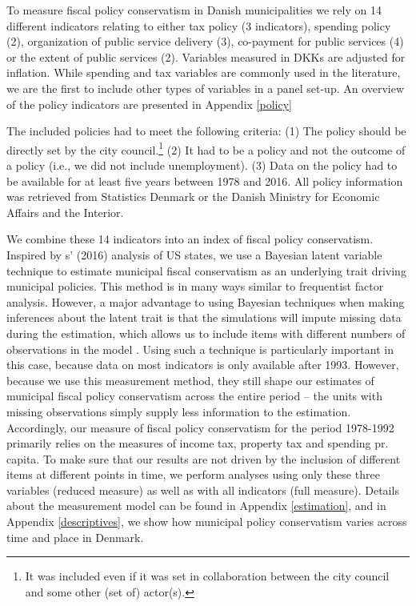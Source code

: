 \documentclass[a4paper,12pt]{article}
\begin{document}
To measure fiscal policy conservatism in Danish municipalities we rely on 14 different indicators relating to either tax policy (3 indicators), spending policy (2), organization of public service delivery (3), co-payment for public services (4) or the extent of public services (2). Variables measured in DKKs are adjusted for inflation. While  spending and tax variables are commonly used in the literature, we are the first to include other types of variables in a panel set-up. An overview of the policy indicators are presented in Appendix \ref{policy}


The included policies had to meet the following criteria: (1) The policy should be directly set by the city council.\footnote{It was included even if it was set in collaboration between the city council and some other (set of) actor(s).} (2) It had to be a policy and not the outcome of a policy (i.e., we did not include unemployment). (3) Data on the policy had to be available for at least five years between 1978 and 2016. All policy information was retrieved from Statistics Denmark or the Danish Ministry for Economic Affairs and the Interior.


We combine these 14 indicators into an index of fiscal policy conservatism. Inspired by \citeauthor{caughey2016dynamics}s' (2016) analysis of US states, we use a Bayesian latent variable technique to estimate municipal fiscal conservatism as an underlying trait driving municipal policies.  This method is in many ways similar to frequentist factor analysis. However, a major advantage to using Bayesian techniques when making inferences about the latent trait is that the simulations will impute missing data during the estimation, which allows us to include items with different numbers of observations in the model . Using such a technique is particularly important in this case, because data on most indicators is only available after 1993. However, because we use this measurement method, they still shape our estimates of municipal fiscal policy conservatism across the entire period -- the units with missing observations simply supply less information to the estimation. Accordingly, our measure of fiscal policy conservatism for the period 1978-1992 primarily relies on the measures of income tax, property tax and spending pr. capita. To make sure that our results are not driven by the inclusion of different items at different points in time, we perform analyses using only these three variables (reduced measure) as well as with all indicators (full measure). Details about the measurement model can be found in Appendix \ref{estimation}, and in Appendix \ref{descriptives}, we show how municipal policy conservatism varies across time and place in Denmark.
\end{document}
